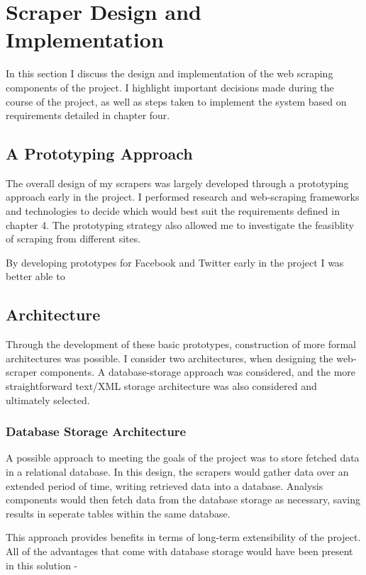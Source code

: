 \chapter{Scraper Design and Implementation}\label{C:us}

In this section I discuss the design and implementation of the web scraping components of the project. I highlight important decisions made during the course of the project, as well as steps taken to implement the system based on requirements detailed in chapter four.

\section{A Prototyping Approach}

The overall design of my scrapers was largely developed through a prototyping approach early in the project. I performed research and web-scraping frameworks and technologies to decide which would best suit the requirements defined in chapter 4. The prototyping strategy also allowed me to investigate the feasiblity of scraping from different sites.

By developing prototypes for Facebook and Twitter early in the project I was better able to 

\section{Architecture}

Through the development of these basic prototypes, construction of more formal architectures was possible. I consider two architectures, when designing the web-scraper components. A database-storage approach was considered, and the more straightforward text/XML storage architecture was also considered and ultimately selected. 

\subsection{Database Storage Architecture}

A possible approach to meeting the goals of the project was to store fetched data in a relational database. In this design, the scrapers would gather data over an extended period of time, writing retrieved data into a database. Analysis components would then fetch data from the database storage as necessary, saving results in seperate tables within the same database.

This approach provides benefits in terms of long-term extensibility of the project. All of the advantages that come with database storage would have been present in this solution - 

